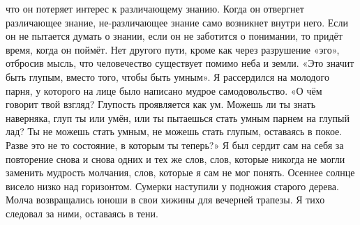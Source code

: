\documentclass[a4paper]{book}
\begin{document}
что он потеряет интерес к различающему знанию. Когда он отвергнет различающее знание,
не-различающее знание само возникнет внутри него. Если он не пытается думать о знании,
если он не заботится о понимании, то придёт время, когда он поймёт. Нет другого пути,
кроме как через разрушение «эго», отбросив мысль, что человечество существует помимо
неба и земли.
«Это значит быть глупым, вместо того, чтобы быть умным». Я рассердился на молодого
парня, у которого на лице было написано мудрое самодовольство. «О чём говорит твой
взгляд? Глупость проявляется как ум. Можешь ли ты знать наверняка, глуп ты или умён, или
ты пытаешься стать умным парнем на глупый лад? Ты не можешь стать умным, не можешь
стать глупым, оставаясь в покое. Разве это не то состояние, в которым ты теперь?»
Я был сердит сам на себя за повторение снова и снова одних и тех же слов, слов,
которые никогда не могли заменить мудрость молчания, слов, которые я сам не мог понять.
Осеннее солнце висело низко над горизонтом. Сумерки наступили у подножия старого
дерева. Молча возвращались юноши в свои хижины для вечерней трапезы. Я тихо следовал за
ними, оставаясь в тени.
\end{document}
